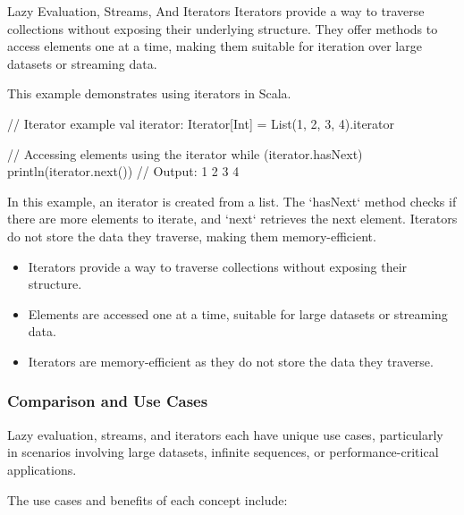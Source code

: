 \begin{notes}{Lazy Evaluation, Streams, And Iterators}
    Iterators provide a way to traverse collections without exposing their underlying structure. They offer methods to access elements one at a time, making them suitable for iteration over large datasets or streaming data.
    
    \begin{highlight}[Iterators]
    
        This example demonstrates using iterators in Scala.
    
    \begin{code}[Scala]
    // Iterator example
    val iterator: Iterator[Int] = List(1, 2, 3, 4).iterator
    
    // Accessing elements using the iterator
    while (iterator.hasNext) {
        println(iterator.next())  // Output: 1 2 3 4
    }
    \end{code}
    
        In this example, an iterator is created from a list. The `hasNext` method checks if there are more elements to iterate, and `next` retrieves the next element. Iterators do not store the data they traverse, making them memory-efficient.
    
        \begin{itemize}
            \item Iterators provide a way to traverse collections without exposing their structure.
            \item Elements are accessed one at a time, suitable for large datasets or streaming data.
            \item Iterators are memory-efficient as they do not store the data they traverse.
        \end{itemize}
    
    \end{highlight}
    
    \subsubsection*{Comparison and Use Cases}
    
    Lazy evaluation, streams, and iterators each have unique use cases, particularly in scenarios involving large datasets, infinite sequences, or performance-critical applications.
    
    \begin{highlight}
    
        The use cases and benefits of each concept include:
    

\end{highlight}
\end{notes}

